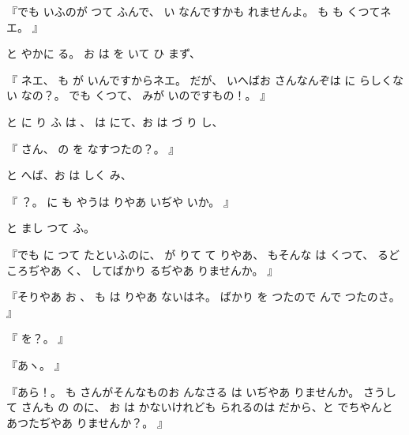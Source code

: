 『でも
いふのが
つて
ふんで、
い
なんですかも
れませんよ。
も
も
くつてネエ。
』

と
やかに
る。
お
は
を
いて
ひ
まず、

『
ネエ、
も
が
いんですからネエ。
だが、
いへばお
さんなんぞは
に
らしくない
なの？。
でも
くつて、
みが
いのですもの！。
』

と
に
り
ふ
は
、
は
にて、お
は
づ
り
し、

『
さん、
の
を
なすつたの？。
』

と
へば、お
は
しく
み、

『
？。
に
も
やうは
りやあ
いぢや
いか。
』

と
まし
つて
ふ。

『でも
に
つて
たといふのに、
が
りて
て
りやあ、
もそんな
は
くつて、
るどころぢやあ
く、
してばかり
るぢやあ
りませんか。
』

『そりやあ
お
、
も
は
りやあ
ないはネ。
ばかり
を
つたので
んで
つたのさ。
』

『
を？。
』

『あヽ。
』

『あら！。
も
さんがそんなものお
んなさる
は
いぢやあ
りませんか。
さうして
さんも
の
のに、
お
は
かないけれども
られるのは
だから、と
でちやんと
あつたぢやあ
りませんか？。
』

